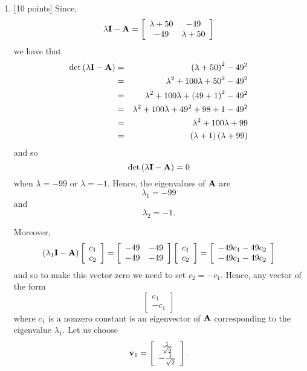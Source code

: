 \begin{solution}
\begin{enumerate}
\item {[10 points]} Since,
\[
\lambda{\bf I}-{\bf A}=\left[\begin{array}{cc}\lambda+50 & -49\\-49 & \lambda+50\end{array}\right]
\]
we have that
\begin{eqnarray*}
\det\left(\lambda{\bf I}-{\bf A}\right)&=&\left(\lambda+50\right)^2-49^2
\\
&=&\lambda^2+100\lambda+50^2-49^2
\\
&=&\lambda^2+100\lambda+\left(49+1\right)^2-49^2
\\
&=&\lambda^2+100\lambda+49^2+98+1-49^2
\\
&=&\lambda^2+100\lambda+99
\\
&=&\left(\lambda+1\right)\left(\lambda+99\right)
\end{eqnarray*}
and so
\[
\det\left(\lambda{\bf I}-{\bf A}\right)=0
\]
when $\lambda=-99$ or $\lambda=-1$. Hence, the eigenvalues of ${\bf A}$ are
\[
\lambda_1=-99
\]
and
\[
\lambda_2=-1.
\]

Moreover,
\[
\left(\lambda_1{\bf I}-{\bf A}\right)\left[\begin{array}{c}c_1 \\ c_2\end{array}\right]=\left[\begin{array}{cc}-49 & -49\\-49 & -49\end{array}\right]\left[\begin{array}{c}c_1 \\ c_2\end{array}\right]=\left[\begin{array}{c}-49c_1-49c_2 \\ -49c_1-49c_2\end{array}\right]
\]
and so to make this vector zero we need to set $c_2=-c_1$. Hence, any vector of the form
\[
\left[\begin{array}{c}c_1 \\ -c_1\end{array}\right]
\]
where $c_1$ is a nonzero constant is an eigenvector of ${\bf A}$ corresponding to the eigenvalue $\lambda_1$. Let us choose
\[
{\bf v}_1=\left[\begin{array}{c}{1\over\sqrt{2}} \\ -{1\over\sqrt{2}}\end{array}\right].
\]


\end{enumerate}
\end{solution}
